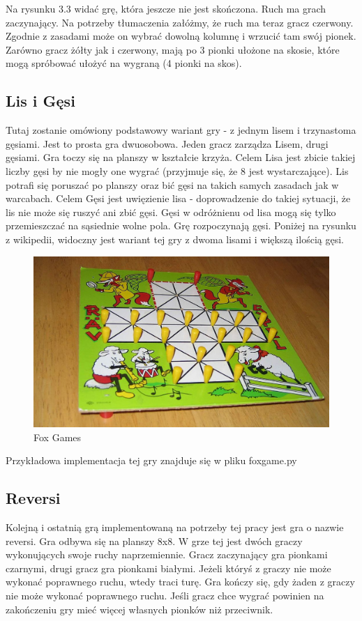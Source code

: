 \documentclass[polish,shortabstract,inz]{iithesis}
\begin{document}
Na rysunku 3.3 widać grę, która jeszcze nie jest skończona.
Ruch ma grach zaczynający. Na potrzeby tłumaczenia załóżmy, że ruch ma teraz gracz czerwony.
Zgodnie z zasadami może on wybrać dowolną kolumnę i wrzucić tam swój pionek.
Zarówno gracz żółty jak i czerwony, mają po 3 pionki ułożone na skosie, które mogą spróbować ułożyć na wygraną (4 pionki na skos).


\subsection{Lis i Gęsi}
Tutaj zostanie omówiony podstawowy wariant gry - z jednym lisem i trzynastoma gęsiami.
Jest to prosta gra dwuosobowa. Jeden gracz zarządza Lisem, drugi gęsiami.
Gra toczy się na planszy w kształcie krzyża.
Celem Lisa jest zbicie takiej liczby gęsi by nie mogły one wygrać (przyjmuje się, że 8 jest wystarczające).
Lis potrafi się poruszać po planszy oraz bić gęsi na takich samych zasadach jak w warcabach.
Celem Gęsi jest uwięzienie lisa - doprowadzenie do takiej sytuacji, że lis nie może się ruszyć ani zbić gęsi.
Gęsi w odróżnienu od lisa mogą się tylko przemieszczać na sąsiednie wolne pola.
Grę rozpoczynają gęsi.
Poniżej na rysunku z wikipedii, widoczny jest wariant tej gry z dwoma lisami i większą ilością gęsi.
\begin{figure}[H]
  \includegraphics[scale=0.25]{./images/foxgames.jpg}
  \centering
  \caption{Fox Games}
  \label{fig:fg}
\end{figure}

Przykładowa implementacja tej gry znajduje się w pliku fox\textunderscore game.py

\subsection{Reversi}
Kolejną i ostatnią grą implementowaną na potrzeby tej pracy jest gra o nazwie reversi.
Gra odbywa się na planszy 8x8.
W grze tej jest dwóch graczy wykonujących swoje ruchy naprzemiennie.
Gracz zaczynający gra pionkami czarnymi, drugi gracz gra pionkami białymi.
Jeżeli któryś z graczy nie może wykonać poprawnego ruchu, wtedy traci turę.
Gra kończy się, gdy żaden z graczy nie może wykonać poprawnego ruchu.
Jeśli gracz chce wygrać powinien na zakończeniu gry mieć więcej własnych pionków niż przeciwnik.
\end{document}
